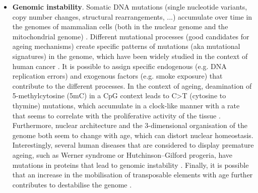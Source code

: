 \begin{itemize}
	
	\item \textbf{Genomic instability}. Somatic DNA mutations (single nucleotide variants, copy number changes, structural rearrangements, ...) accumulate over time in the genomes of mammalian cells (both in the nuclear genome and the mitochondrial genome) \cite{Martincorena2018,Larsson2010}. Different mutational processes (good candidates for ageing mechanisms) create specific patterns of mutations (aka mutational signatures) in the genome, which have been widely studied in the context of human cancer \cite{Alexandrov2014}. It is possible to assign specific endogenous (e.g. DNA replication errors) and exogenous factors (e.g. smoke exposure) that contribute to the different processes. In the context of ageing, deamination of 5-methylcytosine (\acrshort{5mC}) in a \acrshort{CpG} context leads to C>T (cytosine to thymine) mutations, which accumulate in a clock-like manner with a rate that seems to correlate with the proliferative activity of the tissue \cite{Alexandrov2015}. Furthermore, nuclear architecture and the 3-dimensional organisation of the genome both seem to change with age, which can distort nuclear homeostasis. Interestingly, several human diseases that are considered to display premature ageing, such as Werner syndrome or Hutchinson–Gilford progeria, have mutations in proteins that lead to genomic instability \cite{Oberdoerffer2007}. Finally, it is possible that an increase in the mobilisation of transposable elements with age further contributes to destabilise the genome \cite{Orr2016}.
	

\end{itemize}
